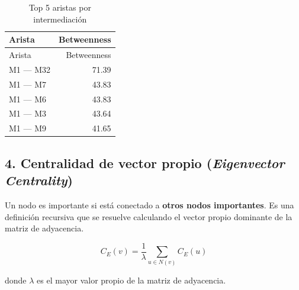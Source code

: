 \documentclass[
  letterpaper,
  DIV=11,
  numbers=noendperiod]{scrreprt}
\newenvironment{Shaded}{\begin{snugshade}}{\end{snugshade}}
\newcommand{\AttributeTok}[1]{\textcolor[rgb]{0.40,0.45,0.13}{#1}}
\newcommand{\ConstantTok}[1]{\textcolor[rgb]{0.56,0.35,0.01}{#1}}
\newcommand{\DecValTok}[1]{\textcolor[rgb]{0.68,0.00,0.00}{#1}}
\newcommand{\FunctionTok}[1]{\textcolor[rgb]{0.28,0.35,0.67}{#1}}
\newcommand{\NormalTok}[1]{\textcolor[rgb]{0.00,0.23,0.31}{#1}}
\newcommand{\OtherTok}[1]{\textcolor[rgb]{0.00,0.23,0.31}{#1}}
\newcommand{\SpecialCharTok}[1]{\textcolor[rgb]{0.37,0.37,0.37}{#1}}
\newcommand{\StringTok}[1]{\textcolor[rgb]{0.13,0.47,0.30}{#1}}
\begin{document}
\begin{longtable}[]{@{}lr@{}}
\caption{Top 5 aristas por intermediación}\tabularnewline
\toprule\noalign{}
Arista & Betweenness \\
\midrule\noalign{}
\endfirsthead
\toprule\noalign{}
Arista & Betweenness \\
\midrule\noalign{}
\endhead
\bottomrule\noalign{}
\endlastfoot
M1 --- M32 & 71.39 \\
M1 --- M7 & 43.83 \\
M1 --- M6 & 43.83 \\
M1 --- M3 & 43.64 \\
M1 --- M9 & 41.65 \\
\end{longtable}

\subsection{\texorpdfstring{4. Centralidad de vector propio
(\emph{Eigenvector
Centrality})}{4. Centralidad de vector propio (Eigenvector Centrality)}}\label{centralidad-de-vector-propio-eigenvector-centrality}

Un nodo es importante si está conectado a \textbf{otros nodos
importantes}. Es una definición recursiva que se resuelve calculando el
vector propio dominante de la matriz de adyacencia.

\[
C_E(v) = \frac{1}{\lambda} \sum_{u \in N(v)} C_E(u)
\]

donde \(\lambda\) es el mayor valor propio de la matriz de adyacencia.

\begin{Shaded}
\end{Shaded}
\end{document}
